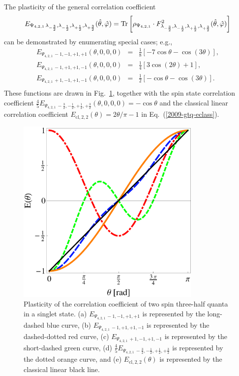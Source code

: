 \documentclass[fleqn,twoside]{article}      %
\begin{document}
The plasticity of the general correlation coefficient
\begin{equation}
E_{{ \Psi_{4,2,1}}\,\lambda_{-\frac{3}{2}},\lambda_{-\frac{1}{2}}, \lambda_{+\frac{1}{2}}, \lambda_{+\frac{3}{2}} } ({\hat \theta},{\hat \varphi} )
=
{\rm Tr}\left[ \rho_{ \Psi_{4,2,1}} \cdot  F^2_{\lambda_{-\frac{3}{2}},\lambda_{-\frac{1}{2}}, \lambda_{+\frac{1}{2}}, \lambda_{+\frac{3}{2}} } ({\hat \theta},{\hat \varphi})\right]
\label{2009-gtq-gpe4}
\end{equation}
can be demonstrated by enumerating special cases; e.g.,
\begin{equation}
\begin{array}{rcl}
E_{{ \Psi_{4,2,1}}\,-1,-1, +1, +1 } ( \theta ,0,0,0 )
&=& \frac{1}{8} \left[-7 \cos \theta -\cos (3 \theta )\right]
,
\\
E_{{ \Psi_{4,2,1}}\,-1,+1, +1, -1 } ( \theta ,0,0,0 )
&=& \frac{1}{4} \left[3 \cos (2 \theta )+1\right]
,
\\
E_{{ \Psi_{4,2,1}}\,+1,-1, +1, -1 } ( \theta ,0,0,0 )
&=& \frac{1}{2} \left[-\cos \theta -\cos (3 \theta )\right]
.
\\
\end{array}
\label{2009-gtq-e4-plast}
\end{equation}
These functions are drawn in Fig.~\ref{2009-gtq-gr4},
together with the spin state correlation coefficient
$\frac{4}{5}E_{{ \Psi_{4,2,1}}\,-\frac{3}{2},-\frac{1}{2}, +\frac{1}{2}, +\frac{3}{2} }
( \theta ,0,0,0 ) = -\cos \theta $
and the classical linear correlation coefficient
$E_{\text{cl},2,2}(\theta ) = {2 \theta / \pi} - 1$
in Eq.~(\ref{2009-gtq-eclass}).
\begin{figure}[htbp]
  \centering
\includegraphics[width=90mm]{2009-gtq-gr4}
\caption{Plasticity of the correlation coefficient of two spin three-half quanta in a singlet state.
(a) $E_{{ \Psi_{4,2,1}}\,-1,-1, +1, +1 }$ is represented by the long-dashed blue curve,
(b) $E_{{ \Psi_{4,2,1}}\,-1,+1, +1, -1  }$ is represented by the dashed-dotted red curve,
(c) $E_{{ \Psi_{4,2,1}}\,+1,-1, +1, -1  }$ is represented by the short-dashed green curve,
(d) $\frac{4}{5}E_{{ \Psi_{4,2,1}}\,-\frac{3}{2},-\frac{1}{2}, +\frac{1}{2}, +\frac{3}{2} }$ is represented by the dotted orange curve,
and (e) $E_{\text{cl},2,2}(\theta )$ is represented by the classical linear  black line.
}
\label{2009-gtq-gr4}
\end{figure}
\end{document}
